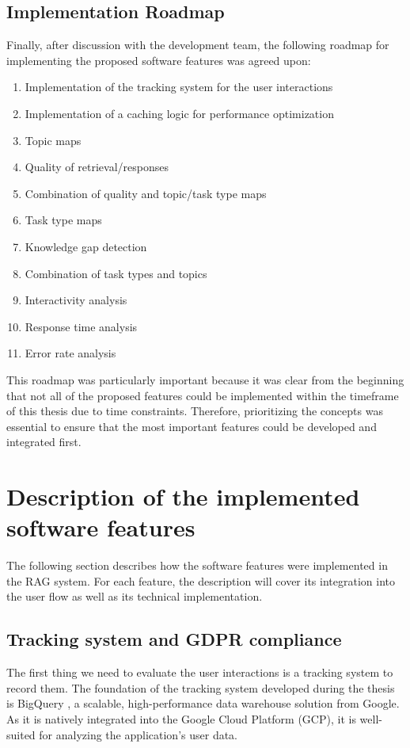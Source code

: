 \documentclass[
	english,
	ruledheaders=section,%
	class=report,%
	thesis={type=bachelor},%
	accentcolor=1b,%
	custommargins=true,%
	marginpar=false,%
	parskip=half-,%
	fontsize=11pt,%
	DIV=14,
]{tudapub}
\begin{document}
\subsection{Implementation Roadmap}
Finally, after discussion with the development team, the following roadmap for implementing the proposed software features was agreed upon:
\begin{enumerate}
    \item Implementation of the tracking system for the user interactions
    \item Implementation of a caching logic for performance optimization
    \item Topic maps
    \item Quality of retrieval/responses
    \item Combination of quality and topic/task type maps
    \item Task type maps
    \item Knowledge gap detection
    \item Combination of task types and topics
    \item Interactivity analysis
    \item Response time analysis
    \item Error rate analysis
\end{enumerate}
This roadmap was particularly important because it was clear from the beginning that not all of the proposed features could be implemented within the timeframe of this thesis due to time constraints. Therefore, prioritizing the concepts was essential to ensure that the most important features could be developed and integrated first.
\section{Description of the implemented software features}
The following section describes how the software features were implemented in the RAG system. For each feature, the description will cover its integration into the user flow as well as its technical implementation.
\subsection{Tracking system and GDPR compliance}
The first thing we need to evaluate the user interactions is a tracking system to record them. The foundation of the tracking system developed during the thesis is BigQuery \parencite{GoogleBigQuery}, a scalable, high-performance data warehouse solution from Google. As it is natively integrated into the Google Cloud Platform (GCP), it is well-suited for analyzing the application's user data.
\end{document}
